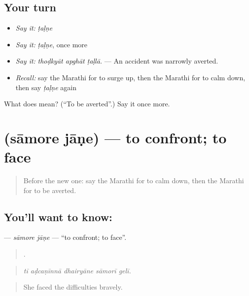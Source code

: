 \subsection*{Your turn}
\begin{itemize}
\raggedright
  \item \emph{Say it:} \emph{ṭaḷṇe}
  \item \emph{Say it:} \emph{ṭaḷṇe}, once more
  \item \emph{Say it:} \emph{thoḍkyāt apghāt ṭaḷlā.} — An accident was narrowly averted.
  \item \emph{Recall:} say the Marathi for to surge up, then the Marathi for to calm down, then say \emph{ṭaḷṇe} again
\end{itemize}

\begin{tcolorbox}[breakable,colback=teal!4,colframe=teal!35!black,title={Before you move on}]
What does  mean? (\textquotedblleft{}To be averted\textquotedblright{}.) Say it once more.
\end{tcolorbox}
\section[\texorpdfstring{\mr{सामोरे} \mr{जाणे} (sāmore jāṇe)}{सामोरे जाणे (sāmore jāṇe)}]{  (sāmore jāṇe) — to confront; to face}

\label{lesson:MR-C385-samore-jane}



\begin{quote}
Before the new one: say the Marathi for to calm down, then the Marathi for to be averted.
\end{quote}

\subsection*{You'll want to know:  }
\textbf{ } — \emph{sāmore jāṇe} — \textquotedblleft{}to confront; to face\textquotedblright{}.

\begin{quote}
    .
\end{quote}

\begin{quote}
\emph{tī aḍcaṇīnnā dhairyāne sāmorī gelī.}
\end{quote}

\begin{quote}
She faced the difficulties bravely.
\end{quote}

